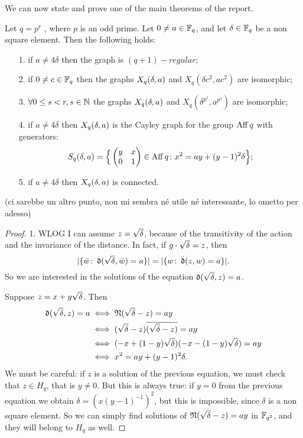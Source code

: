 We can now state and prove one of the main theorems of the report.

\begin{theorem}\label{important}
Let $q=p^r$ , where $p$ is an odd prime. Let $0\neq a\in {\mathbb F}_q$, and let $\delta \in {\mathbb F}_q$ be a non square element.
Then the following holds:
\begin{itemize}
\item[1.] if $a\neq 4\delta$ then the graph is $(q+1)-regular$;
\item[2.] if $0\neq c\in {\mathbb F}_q$ then the graphs $X_q (\delta ,a)$ and $X_q(\delta c^2, a c^2)$ are isomorphic;  
\item[3.] $\forall 0 \leq s < r, s\in {\mathbb N}$ the graphs $X_q (\delta ,a)$ and $X_q (\delta^{p^s}, a^{p^s})$ are isomorphic;
\item[4.] if $a\neq 4\delta$ then $X_q (\delta ,a)$ is the Cayley graph for the group $\operatorname{Aff} q$ with generators:
\begin{equation}\label{generators}
	S_q(\delta,a) = \Big\{ \begin{pmatrix} y & x \\ 0 & 1 \end{pmatrix} \in \operatorname{Aff} q \colon x^2=ay+(y-1)^2 \delta \Big\};
\end{equation}
\item[5.] if $a\neq 4\delta$ then $X_q (\delta ,a)$ is connected.
\end{itemize}


(ci sarebbe un altro punto, non mi sembra né utile né interessante, lo ometto per adesso)
\begin{proof}
1. WLOG I can assume $z=\sqrt{\delta}$, because of the transitivity of the action and the invariance of the distance.
In fact, if $g \cdot \sqrt{\delta} = z$, then 
\begin{equation*}
\lvert \{\bar{w} \colon \operatorname{\mathfrak{d}} (\sqrt{\delta}, \bar{w})=a\}\rvert=\lvert \{w \colon \operatorname{\mathfrak{d}} (z,w)=a \} \rvert.
\end{equation*}
So we are interested in the solutions of the equation $\operatorname{\mathfrak{d}} (\sqrt{\delta}, z)=a$.

Suppose $z=x+y\sqrt{\delta}$. Then
\begin{align} \label{distance}
	\operatorname{\mathfrak{d}} (\sqrt{\delta}, z)=a & \iff \operatorname{\mathfrak{N}} (\sqrt{\delta} - z) = ay\\		\notag
					 & \iff (\sqrt{\delta} - z)\overline{(\sqrt{\delta} - z)}=ay\\ \notag
					 & \iff (-x+(1-y)\sqrt{\delta})(-x-(1-y)\sqrt{\delta} )=ay\\   \notag
					 & \iff x^2 = ay + (y-1)^2 \delta. 
\end{align}
We must be careful: if $z$ is a solution of the previous equation, we must check that $z\in H_q$, that is $y\neq 0$.
But this is always true: if $y=0$ from the previous equation we obtain $\delta=(x(y-1)^{-1})^2$,
but this is impossible, since $\delta$ is a non square element.
So we can simply find solutions of $\operatorname{\mathfrak{N}} (\sqrt{\delta} - z) = ay$ in ${\mathbb F}_{q^2}$, and they will belong to $H_q$ as well.


\end{proof}
\end{theorem}
